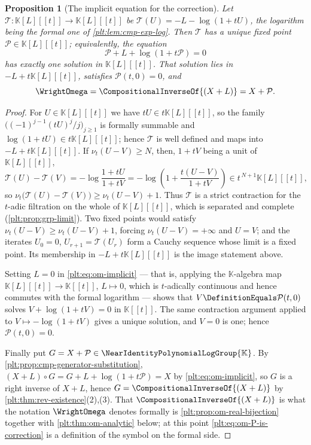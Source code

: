\documentclass[11pt,oneside]{article}
\theoremstyle{plain}
\newtheorem{proposition}[theorem]{Proposition}
\theoremstyle{definition}
\theoremstyle{remark}
\newcommand{\K}{\mathbb{K}}
\newcommand{\Gnear}{\NearIdentityPolynomialLogGroup{\K}} %
\newcommand{\ordt}{\nu_{t}}                              %
\newcommand{\compose}{\mathbin{\circ}}
\newcommand{\rev}[1]{\CompositionalInverseOf{#1}}
\begin{document}
\begin{proposition}[The implicit equation for the correction]
\label{plt:prop:om-implicit}
Let \(\mathcal T\colon\K[L][[t]]\to\K[L][[t]]\) be
\(\mathcal T(U)=-L-\log(1+tU)\), the logarithm being the formal one of
\cref{plt:lem:cmp-exp-log}.  Then \(\mathcal T\) has a unique fixed point
\(\mathcal P\in\K[L][[t]]\); equivalently, the equation
\begin{equation}\label{plt:eq:om-implicit}
 \mathcal P+L+\log(1+t\mathcal P)=0
\end{equation}
has exactly one solution in \(\K[L][[t]]\).  That solution lies in
\(-L+t\K[L][[t]]\), satisfies \(\mathcal P(t,0)=0\), and
\begin{equation}\label{plt:eq:om-P-is-correction}
 \WrightOmega=\rev{(X+L)}=X+\mathcal P .
\end{equation}
\end{proposition}

\begin{proof}
For \(U\in\K[L][[t]]\) we have \(tU\in t\K[L][[t]]\), so the family
\(\bigl((-1)^{j-1}(tU)^{j}/j\bigr)_{j\ge1}\) is formally summable and
\(\log(1+tU)\in t\K[L][[t]]\); hence \(\mathcal T\) is well defined and maps
into \(-L+t\K[L][[t]]\).  If \(\ordt(U-V)\ge N\), then, \(1+tV\) being a unit
of \(\K[L][[t]]\),
\[
 \mathcal T(U)-\mathcal T(V)
 =-\log\frac{1+tU}{1+tV}
 =-\log\left(1+\frac{t(U-V)}{1+tV}\right)\in t^{\,N+1}\K[L][[t]],
\]
so \(\ordt\bigl(\mathcal T(U)-\mathcal T(V)\bigr)\ge\ordt(U-V)+1\).
Thus \(\mathcal T\) is a strict contraction for the \(t\)-adic filtration on
the whole of \(\K[L][[t]]\), which is separated and complete
(\cref{plt:prop:grp-limit}).  Two fixed points would satisfy
\(\ordt(U-V)\ge\ordt(U-V)+1\), forcing \(\ordt(U-V)=+\infty\) and \(U=V\);
and the iterates \(U_0=0\), \(U_{r+1}=\mathcal T(U_r)\) form a Cauchy
sequence whose limit is a fixed point.  Its membership in
\(-L+t\K[L][[t]]\) is the image statement above.

Setting \(L=0\) in \eqref{plt:eq:om-implicit} --- that is, applying the
\(\K\)-algebra map \(\K[L][[t]]\to\K[[t]]\), \(L\mapsto0\), which is
\(t\)-adically continuous and hence commutes with the formal logarithm ---
shows that \(V\DefinitionEquals\mathcal P(t,0)\) solves
\(V+\log(1+tV)=0\) in \(\K[[t]]\).  The same contraction argument applied to
\(V\mapsto-\log(1+tV)\) gives a unique solution, and \(V=0\) is one; hence
\(\mathcal P(t,0)=0\).

Finally put \(G=X+\mathcal P\in\Gnear\).  By
\cref{plt:prop:cmp-generator-substitution},
\((X+L)\compose G=G+L+\log(1+t\mathcal P)=X\) by
\eqref{plt:eq:om-implicit}, so \(G\) is a right inverse of \(X+L\), hence
\(G=\rev{(X+L)}\) by \cref{plt:thm:rev-existence}(2),(3).  That \(\rev{(X+L)}\) is what
the notation \(\WrightOmega\) denotes formally is
\cref{plt:prop:om-real-bijection} together with
\cref{plt:thm:om-analytic} below; at this point
\eqref{plt:eq:om-P-is-correction} is a definition of the symbol on the formal
side.
\end{proof}
\end{document}

